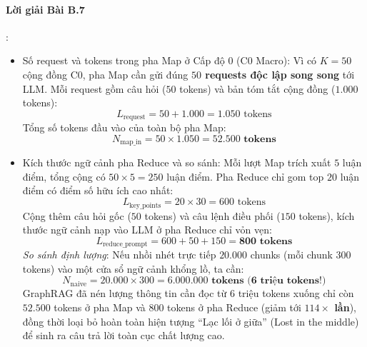 \paragraph{Lời giải Bài B.7}:
\begin{itemize}
  \item[a)] Số request và tokens trong pha Map ở Cấp độ 0 (C0 Macro):
  Vì có $K = 50$ cộng đồng C0, pha Map cần gửi đúng \textbf{$50$ requests độc lập song song} tới LLM.
  Mỗi request gồm câu hỏi ($50$ tokens) và bản tóm tắt cộng đồng ($1.000$ tokens):
  \begin{equation*}
  L_{\text{request}} = 50 + 1.000 = 1.050\text{ tokens}
  \end{equation*}
  Tổng số tokens đầu vào của toàn bộ pha Map:
  \begin{equation*}
  N_{\text{map\_in}} = 50 \times 1.050 = \mathbf{52.500\text{ tokens}}
  \end{equation*}

  \item[b)] Kích thước ngữ cảnh pha Reduce và so sánh:
  Mỗi lượt Map trích xuất $5$ luận điểm, tổng cộng có $50 \times 5 = 250$ luận điểm.
  Pha Reduce chỉ gom top $20$ luận điểm có điểm số hữu ích cao nhất:
  \begin{equation*}
  L_{\text{key\_points}} = 20 \times 30 = 600\text{ tokens}
  \end{equation*}
  Cộng thêm câu hỏi gốc ($50$ tokens) và câu lệnh điều phối ($150$ tokens), kích thước ngữ cảnh nạp vào LLM ở pha Reduce chỉ vỏn vẹn:
  \begin{equation*}
  L_{\text{reduce\_prompt}} = 600 + 50 + 150 = \mathbf{800\text{ tokens}}
  \end{equation*}
  \textit{So sánh định lượng}:
  Nếu nhồi nhét trực tiếp $20.000$ chunks (mỗi chunk $300$ tokens) vào một cửa sổ ngữ cảnh khổng lồ, ta cần:
  \begin{equation*}
  N_{\text{naive}} = 20.000 \times 300 = \mathbf{6.000.000\text{ tokens (6 triệu tokens!)}}
  \end{equation*}
  GraphRAG đã nén lượng thông tin cần đọc từ 6 triệu tokens xuống chỉ còn $52.500$ tokens ở pha Map và $800$ tokens ở pha Reduce (giảm tới \textbf{$114\times$ lần}), đồng thời loại bỏ hoàn toàn hiện tượng ``Lạc lối ở giữa'' (Lost in the middle) để sinh ra câu trả lời toàn cục chất lượng cao.
\end{itemize}

